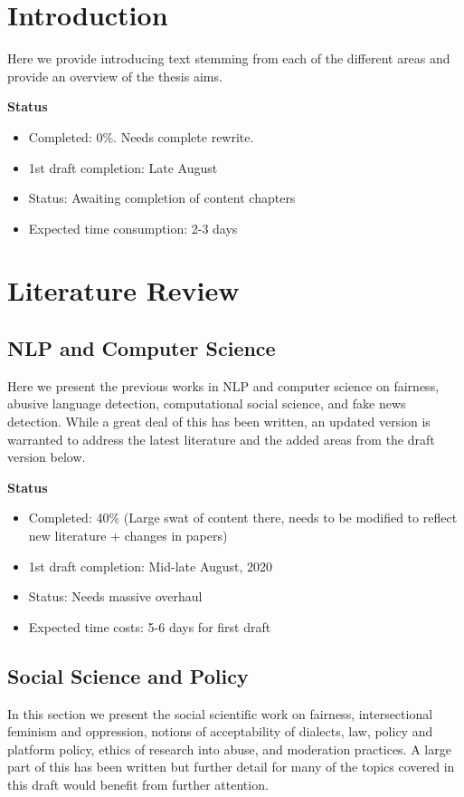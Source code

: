 {\color{red}
\section{Introduction}

Here we provide introducing text stemming from each of the different areas and provide an overview of the thesis aims.

\textbf{Status}
\begin{itemize}
    \item Completed: 0\%. Needs complete rewrite.
    \item 1st draft completion: Late August
    \item Status: Awaiting completion of content chapters
    \item Expected time consumption: 2-3 days
\end{itemize}

\section{Literature Review}

\subsection{NLP and Computer Science}

Here we present the previous works in NLP and computer science on fairness, abusive language detection, computational social science, and fake news detection. While a great deal of this has been written, an updated version is warranted to address the latest literature and the added areas from the draft version below. 

\textbf{Status}
\begin{itemize}
    \item Completed: 40\% (Large swat of content there, needs to be modified to reflect new literature + changes in papers)
    \item 1st draft completion: Mid-late August, 2020
    \item Status: Needs massive overhaul
    \item Expected time costs: 5-6 days for first draft
\end{itemize}

\subsection{Social Science and Policy}
In this section we present the social scientific work on fairness, intersectional feminism and oppression, notions of acceptability of dialects, law, policy and platform policy, ethics of research into abuse, and moderation practices. A large part of this has been written but further detail for many of the topics covered in this draft would benefit from further attention.

}
